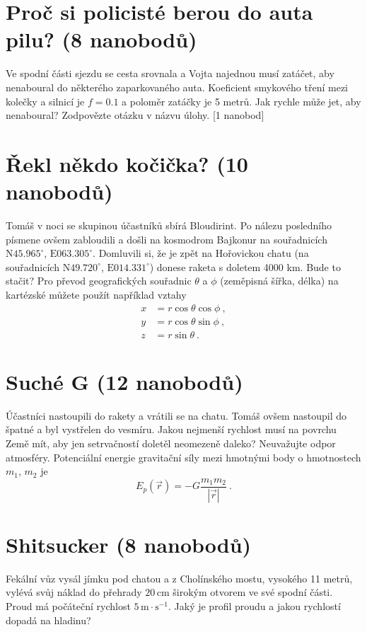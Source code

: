 \documentclass[10pt,a4paper,landscape]{article}
\begin{document}
\begin{multicols}{2}[]
\section{Proč si policisté berou do auta pilu? (8 nanobodů)}
Ve spodní části sjezdu se cesta srovnala a Vojta najednou musí zatáčet, aby nenaboural do některého zaparkovaného auta. Koeficient smykového tření mezi kolečky a silnicí je $f = 0.1$ a poloměr zatáčky je 5 metrů. Jak rychle může jet, aby nenaboural? Zodpovězte otázku v názvu úlohy. [1 nanobod]
\columnbreak

\section{Řekl někdo kočička? (10 nanobodů)}
Tomáš v noci se skupinou účastníků sbírá Bloudirint. Po nálezu posledního písmene ovšem zabloudili a došli na kosmodrom Bajkonur na souřadnicích $\mathrm{N}45.965^\circ$, $\mathrm{E}063.305^\circ$. Domluvili si, že je zpět na Hořovickou chatu (na souřadnicích $\mathrm{N}49.720^\circ$, $\mathrm{E}014.331^\circ$) donese raketa s doletem 4000 km. Bude to stačit? Pro převod geografických souřadnic $\theta$ a $\phi$ (zeměpisná šířka, délka) na kartézské můžete použít například vztahy
\begin{subequations}
\begin{align}
x &= r\cos\theta\cos\phi ~,\\
y &= r\cos\theta\sin\phi ~,\\
z &= r\sin\theta ~.
\end{align}
\end{subequations}

\section{Suché G (12 nanobodů)}
Účastníci nastoupili do rakety a vrátili se na chatu. Tomáš ovšem nastoupil do špatné a byl vystřelen do vesmíru. Jakou nejmenší rychlost musí na povrchu Země mít, aby jen setrvačností doletěl neomezeně daleko? Neuvažujte odpor atmosféry. Potenciální energie gravitační síly mezi hmotnými body o hmotnostech $m_1$, $m_2$ je
\begin{equation}
E_p\left(\vec{r}\right) = -G\frac{m_1m_2}{\left|\vec{r}\right|} ~.
\end{equation}

\section{Shitsucker (8 nanobodů)}
Fekální vůz vysál jímku pod chatou a z Cholínského mostu, vysokého 11 metrů, vylévá svůj náklad do přehrady $20\,\mathrm{cm}$ širokým otvorem ve své spodní části. Proud má počáteční rychlost $5\,\mathrm{m}\cdot\mathrm{s}^{-1}$. Jaký je profil proudu a jakou rychlostí dopadá na hladinu?


\end{multicols}
\end{document}

